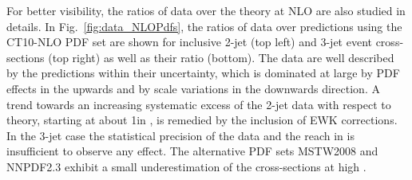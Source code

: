 For better visibility, the ratios of data over the theory at NLO are also studied in details. In Fig.~\ref{fig:data_NLOPdfs}, the ratios of data over \NLOJETPP predictions using the CT10-NLO PDF set are shown for inclusive 2-jet (top left) and 3-jet event cross-sections (top right) as well as their ratio \ratio (bottom). The data are well described by the predictions within their uncertainty, which is dominated at large \httwo by PDF effects in the upwards and by scale variations in the downwards direction. A trend towards an increasing systematic excess of the 2-jet data with respect to theory, starting at about 1\TeV in \httwo, is remedied by the inclusion of EWK corrections. In the 3-jet case the statistical precision of the data and the reach in \httwo is insufficient to observe any effect. The alternative PDF sets MSTW2008 and NNPDF2.3 exhibit a small underestimation of the cross-sections at high \httwo.

